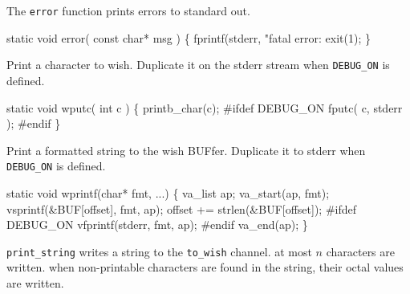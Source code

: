 The {\tt error} function prints errors to standard out.

\nwenddocs{}\endmoddef\let\nwnotused=\nwoutput{}
static void error( const char* msg )
\{
   fprintf(stderr, "fatal error: %
   exit(1);
\}
\nwendcode{}\nwdocspar


Print a character to wish. Duplicate it on
the stderr stream when {\tt DEBUG\_ON} is defined.

\nwenddocs{}\endmoddef\let\nwnotused=\nwoutput{}
static void wputc( int c )
\{
   printb_char(c);
   #ifdef DEBUG_ON
      fputc( c, stderr );
   #endif
\}
\nwendcode{}\nwdocspar


Print a formatted string to the wish BUFfer. Duplicate it to stderr
when {\tt DEBUG\_ON} is defined.

\nwenddocs{}\endmoddef\let\nwnotused=\nwoutput{}
static void wprintf(char* fmt, ...)
\{
  va_list ap;
  va_start(ap, fmt);
  vsprintf(&BUF[offset], fmt, ap);
  offset += strlen(&BUF[offset]);
  #ifdef DEBUG_ON
    vfprintf(stderr, fmt, ap);
  #endif
  va_end(ap);
\}
\nwendcode{}\nwdocspar


{\tt print_string} writes a string to the {\tt to\_wish} channel. 
at most $n$ characters are written.
when non-printable characters are found in the string,
their octal values are written.

